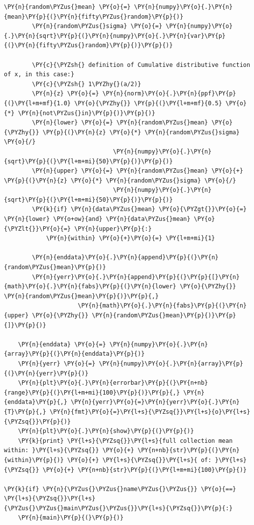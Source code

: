 \documentclass[pdftex,12pt,a4paper]{article}
\begin{document}
\begin{enumerate}
\begin{Verbatim}[commandchars=\\\{\}]
        \PY{n}{random\PYZus{}mean} \PY{o}{=} \PY{n}{numpy}\PY{o}{.}\PY{n}{mean}\PY{p}{(}\PY{n}{fifty\PYZus{}random}\PY{p}{)}
        \PY{n}{random\PYZus{}sigma} \PY{o}{=} \PY{n}{numpy}\PY{o}{.}\PY{n}{sqrt}\PY{p}{(}\PY{n}{numpy}\PY{o}{.}\PY{n}{var}\PY{p}{(}\PY{n}{fifty\PYZus{}random}\PY{p}{)}\PY{p}{)}

        \PY{c}{\PYZsh{} definition of Cumulative distributive function of x, in this case:}
        \PY{c}{\PYZsh{} 1\PYZhy{}(a/2)}
        \PY{n}{z} \PY{o}{=} \PY{n}{norm}\PY{o}{.}\PY{n}{ppf}\PY{p}{(}\PY{l+m+mf}{1.0} \PY{o}{\PYZhy{}} \PY{p}{(}\PY{l+m+mf}{0.5} \PY{o}{*} \PY{n}{not\PYZus{}in}\PY{p}{)}\PY{p}{)}
        \PY{n}{lower} \PY{o}{=} \PY{n}{random\PYZus{}mean} \PY{o}{\PYZhy{}} \PY{p}{(}\PY{n}{z} \PY{o}{*} \PY{n}{random\PYZus{}sigma} \PY{o}{/}
                               \PY{n}{numpy}\PY{o}{.}\PY{n}{sqrt}\PY{p}{(}\PY{l+m+mi}{50}\PY{p}{)}\PY{p}{)}
        \PY{n}{upper} \PY{o}{=} \PY{n}{random\PYZus{}mean} \PY{o}{+} \PY{p}{(}\PY{n}{z} \PY{o}{*} \PY{n}{random\PYZus{}sigma} \PY{o}{/}
                               \PY{n}{numpy}\PY{o}{.}\PY{n}{sqrt}\PY{p}{(}\PY{l+m+mi}{50}\PY{p}{)}\PY{p}{)}
        \PY{k}{if} \PY{n}{data\PYZus{}mean} \PY{o}{\PYZgt{}}\PY{o}{=} \PY{n}{lower} \PY{o+ow}{and} \PY{n}{data\PYZus{}mean} \PY{o}{\PYZlt{}}\PY{o}{=} \PY{n}{upper}\PY{p}{:}
            \PY{n}{within} \PY{o}{+}\PY{o}{=} \PY{l+m+mi}{1}

        \PY{n}{enddata}\PY{o}{.}\PY{n}{append}\PY{p}{(}\PY{n}{random\PYZus{}mean}\PY{p}{)}
        \PY{n}{yerr}\PY{o}{.}\PY{n}{append}\PY{p}{(}\PY{p}{[}\PY{n}{math}\PY{o}{.}\PY{n}{fabs}\PY{p}{(}\PY{n}{lower} \PY{o}{\PYZhy{}} \PY{n}{random\PYZus{}mean}\PY{p}{)}\PY{p}{,}
                     \PY{n}{math}\PY{o}{.}\PY{n}{fabs}\PY{p}{(}\PY{n}{upper} \PY{o}{\PYZhy{}} \PY{n}{random\PYZus{}mean}\PY{p}{)}\PY{p}{]}\PY{p}{)}

    \PY{n}{enddata} \PY{o}{=} \PY{n}{numpy}\PY{o}{.}\PY{n}{array}\PY{p}{(}\PY{n}{enddata}\PY{p}{)}
    \PY{n}{yerr} \PY{o}{=} \PY{n}{numpy}\PY{o}{.}\PY{n}{array}\PY{p}{(}\PY{n}{yerr}\PY{p}{)}
    \PY{n}{plt}\PY{o}{.}\PY{n}{errorbar}\PY{p}{(}\PY{n+nb}{range}\PY{p}{(}\PY{l+m+mi}{100}\PY{p}{)}\PY{p}{,} \PY{n}{enddata}\PY{p}{,} \PY{n}{yerr}\PY{o}{=}\PY{n}{yerr}\PY{o}{.}\PY{n}{T}\PY{p}{,} \PY{n}{fmt}\PY{o}{=}\PY{l+s}{\PYZsq{}}\PY{l+s}{o}\PY{l+s}{\PYZsq{}}\PY{p}{)}
    \PY{n}{plt}\PY{o}{.}\PY{n}{show}\PY{p}{(}\PY{p}{)}
    \PY{k}{print} \PY{l+s}{\PYZsq{}}\PY{l+s}{full collection mean within: }\PY{l+s}{\PYZsq{}} \PY{o}{+} \PY{n+nb}{str}\PY{p}{(}\PY{n}{within}\PY{p}{)} \PY{o}{+} \PY{l+s}{\PYZsq{}}\PY{l+s}{ of: }\PY{l+s}{\PYZsq{}} \PY{o}{+} \PY{n+nb}{str}\PY{p}{(}\PY{l+m+mi}{100}\PY{p}{)}

\PY{k}{if} \PY{n}{\PYZus{}\PYZus{}name\PYZus{}\PYZus{}} \PY{o}{==} \PY{l+s}{\PYZsq{}}\PY{l+s}{\PYZus{}\PYZus{}main\PYZus{}\PYZus{}}\PY{l+s}{\PYZsq{}}\PY{p}{:}
    \PY{n}{main}\PY{p}{(}\PY{p}{)}
        \end{Verbatim}
    \end{enumerate}
\end{document}
